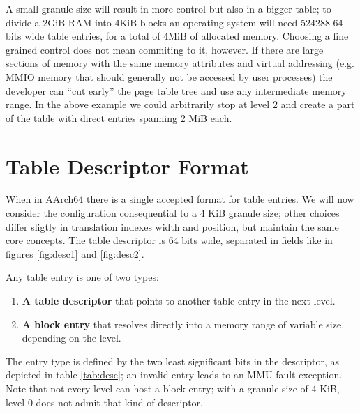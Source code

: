 \documentclass[12pt,a4paper,openright,twoside]{report}
\begin{document}
A small granule size will result in more control but also in a bigger table; to 
divide a 2GiB RAM into 4KiB blocks an operating system will need 524288 64 bits
wide table entries, for a total of 4MiB of allocated memory.
Choosing a fine grained control does not mean commiting to it, however. If there
are large sections of memory with the same memory attributes and virtual addressing
(e.g. MMIO memory that should generally not be accessed by user processes) the 
developer can ``cut early'' the page table tree and use any intermediate memory
range. In the above example we could arbitrarily stop at level 2 and create a part
of the table with direct entries spanning 2 MiB each.


\section{Table Descriptor Format}
When in AArch64 there is a single accepted format for table entries. We will now
consider the configuration consequential to a 4 KiB granule size; other choices
differ sligtly in translation indexes width and position, but maintain the same
core concepts. The table descriptor is 64 bits wide, separated in fields like 
in figures \ref{fig:desc1} and \ref{fig:desc2}.

Any table entry is one of two types:
\begin{enumerate}
    \item \textbf{A table descriptor} that points to another table entry in the 
        next level.
    \item \textbf{A block entry} that resolves directly into a memory range of 
        variable size, depending on the level.
\end{enumerate}

The entry type is defined by the two least significant bits in the descriptor, 
as depicted in table \ref{tab:desc}; an invalid entry leads to an MMU fault exception.
Note that not every level can host a block entry; with a granule size of 4 KiB, 
level 0 does not admit that kind of descriptor.
\end{document}
